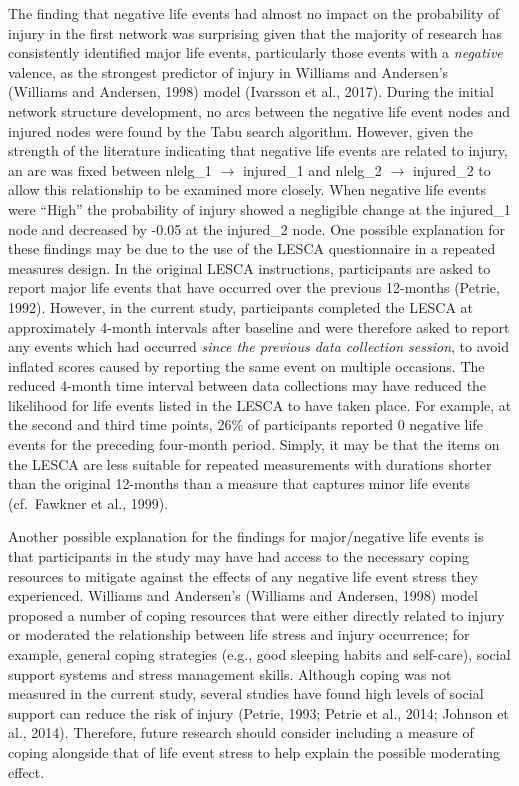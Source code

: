 \documentclass[
  english,
  man]{apa6}
\begin{document}
The finding that negative life events had almost no impact on the probability of injury in the first network was surprising given that the majority of research has consistently identified major life events, particularly those events with a \emph{negative} valence, as the strongest predictor of injury in Williams and Andersen's (Williams and Andersen, 1998) model (Ivarsson et al., 2017).
During the initial network structure development, no arcs between the negative life event nodes and injured nodes were found by the Tabu search algorithm.
However, given the strength of the literature indicating that negative life events are related to injury, an arc was fixed between nlelg\_1 \(\rightarrow\) injured\_1 and nlelg\_2 \(\rightarrow\) injured\_2 to allow this relationship to be examined more closely.
When negative life events were ``High'' the probability of injury showed a negligible change at the injured\_1 node and decreased by -0.05 at the injured\_2 node.
One possible explanation for these findings may be due to the use of the LESCA questionnaire in a repeated measures design.
In the original LESCA instructions, participants are asked to report major life events that have occurred over the previous 12-months (Petrie, 1992).
However, in the current study, participants completed the LESCA at approximately 4-month intervals after baseline and were therefore asked to report any events which had occurred \emph{since the previous data collection session}, to avoid inflated scores caused by reporting the same event on multiple occasions.
The reduced 4-month time interval between data collections may have reduced the likelihood for life events listed in the LESCA to have taken place.
For example, at the second and third time points, 26\% of participants reported 0 negative life events for the preceding four-month period.
Simply, it may be that the items on the LESCA are less suitable for repeated measurements with durations shorter than the original 12-months than a measure that captures minor life events (cf.~Fawkner et al., 1999).

Another possible explanation for the findings for major/negative life events is that participants in the study may have had access to the necessary coping resources to mitigate against the effects of any negative life event stress they experienced.
Williams and Andersen's (Williams and Andersen, 1998) model proposed a number of coping resources that were either directly related to injury or moderated the relationship between life stress and injury occurrence; for example, general coping strategies (e.g., good sleeping habits and self-care), social support systems and stress management skills.
Although coping was not measured in the current study, several studies have found high levels of social support can reduce the risk of injury (Petrie, 1993; Petrie et al., 2014; Johnson et al., 2014).
Therefore, future research should consider including a measure of coping alongside that of life event stress to help explain the possible moderating effect.
\end{document}

